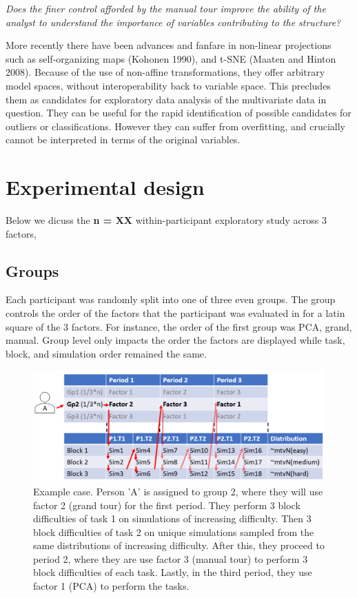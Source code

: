 \documentclass[
]{article}
\begin{document}
\emph{Does the finer control afforded by the manual tour improve the
ability of the analyst to understand the importance of variables
contributing to the structure?}

More recently there have been advances and fanfare in non-linear
projections such as self-organizing maps (Kohonen 1990), and t-SNE
(Maaten and Hinton 2008). Because of the use of non-affine
transformations, they offer arbitrary model spaces, without
interoperability back to variable space. This precludes them as
candidates for exploratory data analysis of the multivariate data in
question. They can be useful for the rapid identification of possible
candidates for outliers or classifications. However they can suffer from
overfitting, and crucially cannot be interpreted in terms of the
original variables.

\hypertarget{sec:design}{%
\section{Experimental design}\label{sec:design}}

Below we dicuss the \textbf{n = XX} within-participant exploratory study
across 3 factors,

\hypertarget{sec:groups}{%
\subsection{Groups}\label{sec:groups}}

Each participant was randomly split into one of three even groups. The
group controls the order of the factors that the participant was
evaluated in for a latin square of the 3 factors. For instance, the
order of the first group was PCA, grand, manual. Group level only
impacts the order the factors are displayed while task, block, and
simulation order remained the same.

\begin{figure}

{\centering \includegraphics[width=1\linewidth]{./figures/experimental_design_personA} 

}

\caption{Example case. Person 'A' is assigned to group 2, where they will use factor 2 (grand tour) for the first period. They perform 3 block difficulties of task 1 on simulations of increasing difficulty. Then 3 block difficulties of task 2 on unique simulations sampled from the same distributions of increasing difficulty. After this, they proceed to period 2, where they are use factor 3 (manual tour) to perform 3 block difficulties of each task. Lastly, in the third period, they use factor 1 (PCA) to perform the tasks.}\label{fig:designExample}
\end{figure}
\end{document}
